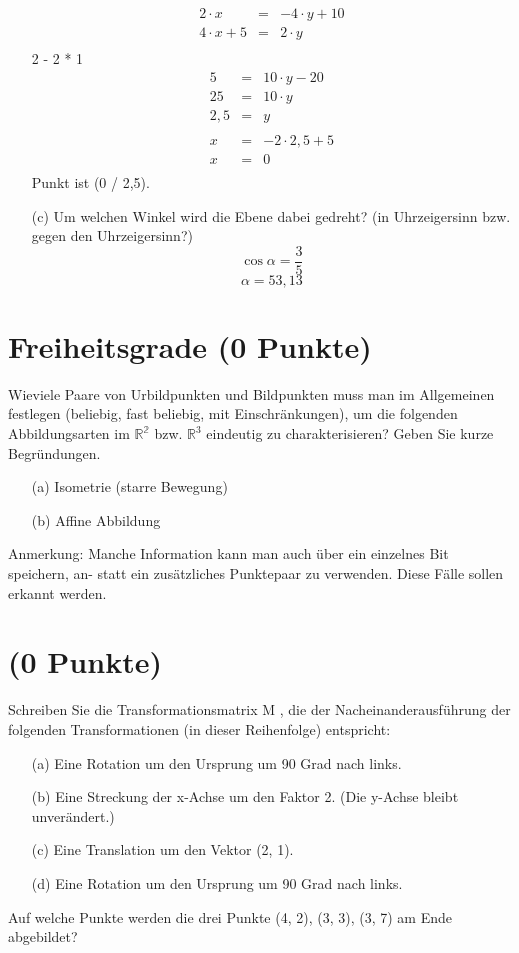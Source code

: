 \documentclass[11pt]{article}
\begin{document}
\begin{enumerate}
\begin{eqnarray*}
2 \cdot x &=& - 4 \cdot y + 10\\
4 \cdot x + 5 &=& 2 \cdot y \\ 
\end{eqnarray*}
2 - 2 * 1
\begin{eqnarray*}
5 &=& 10 \cdot y - 20\\
25 &=& 10 \cdot y \\
2,5 &=& y\\
\\
x &=& -2 \cdot 2,5 + 5\\
x &=& 0 \\
\end{eqnarray*}
Punkt ist (0 / 2,5).
\item[(c)] Um welchen Winkel wird die Ebene dabei gedreht? (in Uhrzeigersinn bzw. gegen den Uhrzeigersinn?)
$$ \cos \alpha = \frac{3}{5} $$
$$ \alpha = 53,13$$
\end{enumerate}
\section{Freiheitsgrade (0 Punkte)}
Wieviele Paare von Urbildpunkten und Bildpunkten muss man im Allgemeinen festlegen (beliebig, fast beliebig, mit Einschränkungen), um die folgenden Abbildungsarten im $\mathbb{R^2}$ bzw. $ \mathbb{R}^3$ eindeutig zu charakterisieren? Geben Sie kurze Begründungen.
\begin{enumerate}
\item[(a)] Isometrie (starre Bewegung)
\item[(b)] Affine Abbildung
\end{enumerate}
Anmerkung: Manche Information kann man auch über ein einzelnes Bit speichern, an-
statt ein zusätzliches Punktepaar zu verwenden. Diese Fälle sollen erkannt werden.
\section{(0 Punkte)} 
Schreiben Sie die Transformationsmatrix M , die der Nacheinanderausführung der folgenden Transformationen (in dieser Reihenfolge) entspricht:
\begin{enumerate}
\item[(a)] Eine Rotation um den Ursprung um 90 Grad nach links.
\item[(b)] Eine Streckung der x-Achse um den Faktor 2. (Die y-Achse bleibt unverändert.)
\item[(c)] Eine Translation um den Vektor (2, 1).
\item[(d)] Eine Rotation um den Ursprung um 90 Grad nach links.
\end{enumerate}
Auf welche Punkte werden die drei Punkte (4, 2), (3, 3), (3, 7) am Ende abgebildet?
\end{document}
